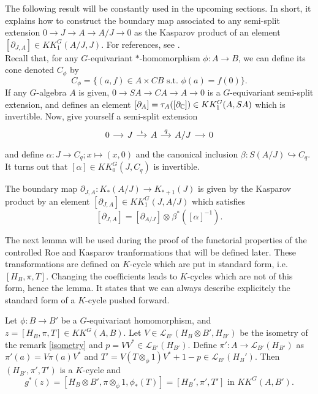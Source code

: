 The following result will be constantly used in the upcoming sections. In short, it explains how to construct the boundary map associated to any semi-split extension $0\rightarrow J\rightarrow A \rightarrow A/J \rightarrow 0$ as the Kasparov product of an element $[\partial_{J,A}]\in KK^G_1(A/J,J)$. For references, see \cite{blackadar}.\\

Recall that, for any $G$-equivariant $*$-homomorphism $\phi : A \rightarrow B$, we can define its cone denoted $C_\phi$ by 
\[C_\phi = \{(a,f)\in A\times CB \text{ s.t. } \phi(a)=f(0)\}.\]
If any $G$-algebra $A$ is given, $0\rightarrow SA\rightarrow CA\rightarrow A \rightarrow 0$ is a $G$-equivariant semi-split extension, and defines an element $[\partial_A]=\tau_A([\partial_\mathbb C])\in KK^G_1(A,SA)$ which is invertible. Now, give yourself a semi-split extension 
\[\begin{tikzcd}[column sep = small]0 \arrow{r} & J \arrow{r}{\iota} & A \arrow{r}{q} & A/J \arrow{r}& 0 \end{tikzcd}\] 
and define $\alpha : J\rightarrow C_q ; x\mapsto (x,0)$ and the canonical inclusion $\beta : S (A/J)\hookrightarrow C_q$. It turns out that $[\alpha]\in KK_0^G(J,C_q)$ is invertible.

\begin{prop}
The boundary map $\partial_{J,A} : K_*(A/J)\rightarrow K_{*+1}(J)$ is given by the Kasparov product by an element $[\partial_{J,A}]\in KK^G_1(J,A/J)$ which satisfies 
\[[\partial_{J,A}] = [\partial_{A/J}]\otimes_{} \beta^*([\alpha]^{-1}).\]
\end{prop}

The next lemma will be used during the proof of the functorial properties of the controlled Roe and Kasparov tranformations that will be defined later. These transformations are defined on $K$-cycle which are put in standard form, i.e. $[H_B,\pi,T]$. Changing the coefficients leads to $K$-cycles which are not of this form, hence the lemma. It states that we can always describe explicitely the standard form of a $K$-cycle pushed forward.

\begin{lem}\label{isometryKK}
Let $\phi : B\rightarrow B'$ be a $G$-equivariant homomorphism, and $z=[H_B,\pi, T]\in KK^G(A,B)$. Let $V\in\mathcal L_{B'}(H_B\otimes B', H_{B'})$ be the isometry of the remark \ref{isometry} and $p = VV^*\in\mathcal L_{B'}(H_{B'})$. Define $\pi' : A\rightarrow \mathcal L_{B'}(H_{B'})$ as $\pi'(a) = V\pi(a)V^*$ and $T'= V(T\otimes_\phi 1)V^* + 1-p \in \mathcal L_{B'}(H_B')$. Then $(H_{B'},\pi',T')$ is a $K$-cycle and 
\[g^*(z) = [H_B\otimes B',\pi\otimes_\phi 1,\phi_*(T)]=[H_B', \pi', T']\text{ in } KK^G(A,B').\]
\end{lem} 

